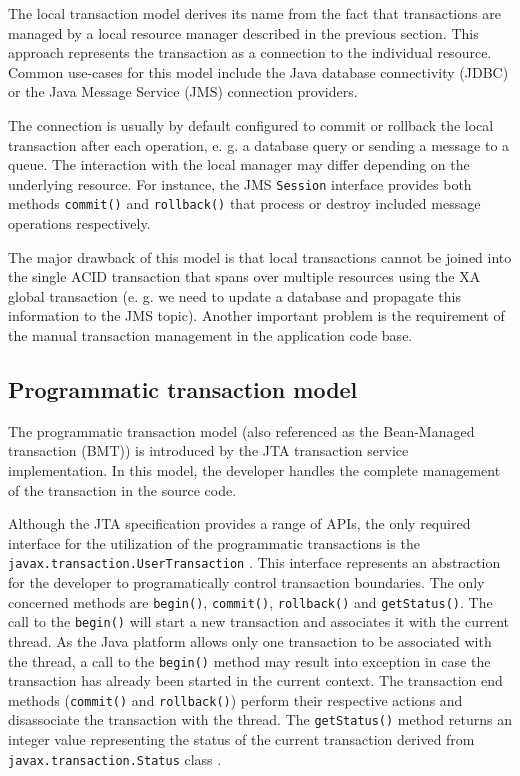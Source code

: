 \documentclass[oneside,
  digital, %
  table,   %
  nolof,     %
  nolot,     %
]{fithesis3}
\begin{document}
The local transaction model derives its name from the fact that transactions are managed by a local resource manager described in the previous section. This approach represents the transaction as a connection to the individual resource. Common use-cases for this model include the Java database connectivity (JDBC) or the Java Message Service (JMS) connection providers.

The connection is usually by default configured to commit or rollback the local transaction after each operation, e. g. a database query or sending a message to a queue. The interaction with the local manager may differ depending on the underlying resource. For instance, the JMS \texttt{Session} interface provides both methods \texttt{commit()} and \texttt{rollback()} that process or destroy included message operations respectively.

The major drawback of this model is that local transactions cannot be joined into the single ACID transaction that spans over multiple resources using the XA global transaction \cite{java_transaction_design_strategies} (e. g. we need to update a database and propagate this information to the JMS topic). Another important problem is the requirement of the manual transaction management in the application code base.

\subsection{Programmatic transaction model}

The programmatic transaction model (also referenced as the Bean-Managed transaction (BMT)) is introduced by the JTA transaction service implementation. In this model, the developer handles the complete management of the transaction in the source code.

Although the JTA specification provides a range of APIs, the only required interface for the utilization of the programmatic transactions is the \texttt{javax.transaction.UserTransaction} \cite{jta}. This interface represents an abstraction for the developer to programatically control transaction boundaries. The only concerned methods are \texttt{begin()}, \texttt{commit()}, \texttt{rollback()} and \texttt{getStatus()}. The call to the \texttt{begin()} will start a new transaction and associates it with the current thread. As the Java platform allows only one transaction to be associated with the thread, a call to the \texttt{begin()} method may result into exception in case the transaction has already been started in the current context. The transaction end methods (\texttt{commit()} and \texttt{rollback()}) perform their respective actions and disassociate the transaction with the thread. The \texttt{getStatus()} method returns an integer value representing the status of the current transaction derived from  \texttt{javax.transaction.Status} class \cite{jta}.
\end{document}
